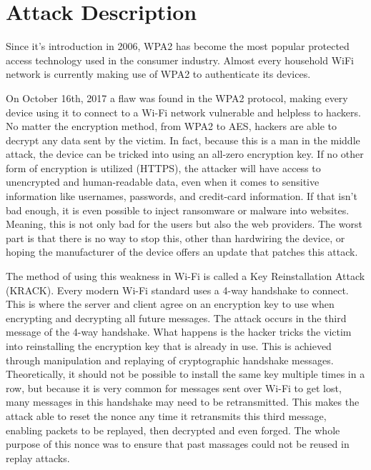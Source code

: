 \documentclass{article}
\begin{document}



\section{Attack Description}\label{attack-description}

Since it's introduction in 2006, WPA2 has become the most popular
protected access technology used in the consumer industry. Almost every
household WiFi network is currently making use of WPA2 to authenticate
its devices. \citet{KrackAttacks}

On October 16th, 2017 a flaw was found in the WPA2 protocol, making
every device using it to connect to a Wi-Fi network vulnerable and
helpless to hackers. No matter the encryption method, from WPA2 to AES,
hackers are able to decrypt any data sent by the victim. In fact,
because this is a man in the middle attack, the device can be tricked
into using an all-zero encryption key. If no other form of encryption is
utilized (HTTPS), the attacker will have access to unencrypted and
human-readable data, even when it comes to sensitive information like
usernames, passwords, and credit-card information. If that isn't bad
enough, it is even possible to inject ransomware or malware into
websites. Meaning, this is not only bad for the users but also the web
providers. The worst part is that there is no way to stop this, other
than hardwiring the device, or hoping the manufacturer of the device
offers an update that patches this attack.

The method of using this weakness in Wi-Fi is called a Key
Reinstallation Attack (KRACK). Every modern Wi-Fi standard uses a 4-way
handshake to connect. This is where the server and client agree on an
encryption key to use when encrypting and decrypting all future
messages. The attack occurs in the third message of the 4-way handshake.
What happens is the hacker tricks the victim into reinstalling the
encryption key that is already in use. This is achieved through
manipulation and replaying of cryptographic handshake messages.
Theoretically, it should not be possible to install the same key
multiple times in a row, but because it is very common for messages sent
over Wi-Fi to get lost, many messages in this handshake may need to be
retransmitted. This makes the attack able to reset the nonce any time it
retransmits this third message, enabling packets to be replayed, then
decrypted and even forged. The whole purpose of this nonce was to ensure
that past massages could not be reused in replay attacks.
\end{document}
